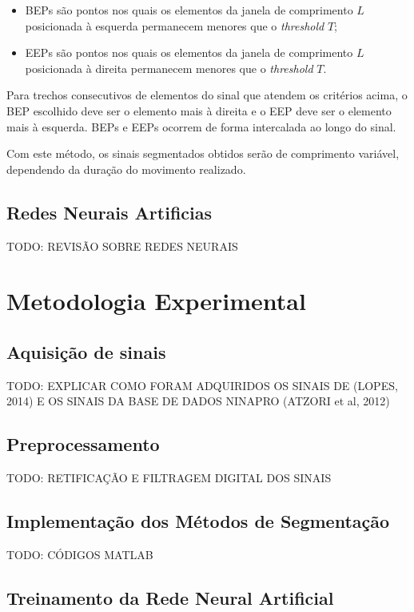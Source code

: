 \documentclass[
	12pt,				%
	openright,			%
	oneside,
	a4paper,			%
	english,			%
	francais,			%
	spanish,			%
	brazil				%
	]{abntex2}
\begin{document}
\begin{itemize}
\item{BEPs são pontos nos quais os elementos da janela de comprimento $L$ posicionada à esquerda permanecem menores que o \emph{threshold} $T$;}
\item{EEPs são pontos nos quais os elementos da janela de comprimento $L$ posicionada à direita permanecem menores que o \emph{threshold} $T$.}
\end{itemize}

	Para trechos consecutivos de elementos do sinal que atendem os critérios acima, o BEP escolhido deve ser o elemento mais à direita e o EEP deve ser o elemento mais à esquerda. BEPs e EEPs ocorrem de forma intercalada ao longo do sinal.
	
	Com este método, os sinais segmentados obtidos serão de comprimento variável, dependendo da duração do movimento realizado.
\section{Redes Neurais Artificias}

	TODO: REVISÃO SOBRE REDES NEURAIS

\chapter{Metodologia Experimental}

\section{Aquisição de sinais}

	TODO: EXPLICAR COMO FORAM ADQUIRIDOS OS SINAIS DE (LOPES, 2014) E OS SINAIS DA BASE DE DADOS NINAPRO (ATZORI et al, 2012)

\section{Preprocessamento}

	TODO: RETIFICAÇÃO E FILTRAGEM DIGITAL DOS SINAIS

\section{Implementação dos Métodos de Segmentação}

	TODO: CÓDIGOS MATLAB

\section{Treinamento da Rede Neural Artificial}
\end{document}
